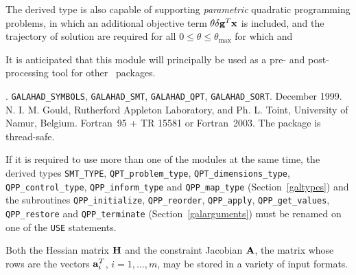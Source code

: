 \documentclass{galahad}
\newcommand{\packagename}{QPP}
\newcommand{\fullpackagename}{\libraryname\_\packagename}
\begin{document}
The derived type is also capable of supporting {\em parametric}
quadratic programming problems, in which an additional objective
term $\theta \delta {\mathbf{g}}^T {\mathbf{x}}$ is included, and the trajectory of 
solution are required for all $0 \leq \theta \leq \theta_{\max}$ 
for which
and 

It is anticipated that this module will principally be used as a pre- and 
post-processing tool for other \galahad\ packages.


\galattributes
\galversions{\tt  \fullpackagename\_single, \fullpackagename\_double}.
\galuses
{\tt GALAHAD\_SY\-M\-BOLS}, 
{\tt GALAHAD\_SMT}, 
{\tt GALAHAD\_QPT},
{\tt GALAHAD\_SORT}.
\galdate December 1999.
\galorigin N. I. M. Gould, Rutherford Appleton Laboratory, and
Ph. L. Toint, University of Namur, Belgium.
\gallanguage Fortran~95 + TR 15581 or Fortran~2003. 
The package is thread-safe.


\galhowto



\noindent
If it is required to use more than one of the modules at the same time, 
the derived types
{\tt SMT\_TYPE},
{\tt QPT\_problem\_type},
{\tt QPT\_dimensions\_type}, 
{\tt \packagename\_control\_type}, 
\sloppy
{\tt \packagename\_inform\_type} 
and
{\tt \packagename\_map\_type}
(Section~\ref{galtypes})
and the subroutines
{\tt \packagename\_initialize}, 
{\tt \packagename\_reorder},
{\tt \packagename\_apply}, 
{\tt \packagename\_get\_values}, 
{\tt \packagename\_restore}
and
{\tt \packagename\_terminate} 
(Section~\ref{galarguments})
must be renamed on one of the {\tt USE} statements.


\galmatrix

Both the Hessian matrix ${\mathbf{H}}$ and
the constraint Jacobian ${\mathbf{A}}$, the matrix 
whose rows are the vectors ${\mathbf{a}}_{i}^{T}$, $i = 1, \ldots , m$, 
may be stored in a variety of input formats.
\end{document}
